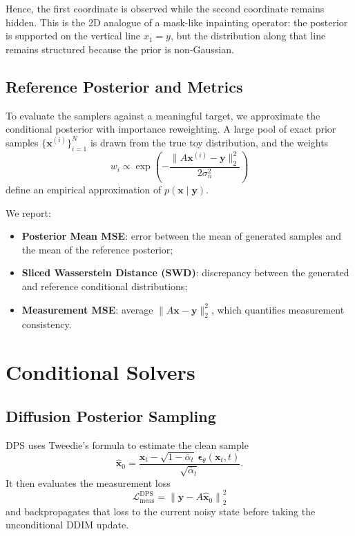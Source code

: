 \documentclass[10pt,twocolumn]{article}
\begin{document}
Hence, the first coordinate is observed while the second coordinate remains hidden. This is the 2D analogue of a mask-like inpainting operator: the posterior is supported on the vertical line \(x_1 = y\), but the distribution along that line remains structured because the prior is non-Gaussian.

\subsection{Reference Posterior and Metrics}

To evaluate the samplers against a meaningful target, we approximate the conditional posterior with importance reweighting. A large pool of exact prior samples \(\{\mathbf{x}^{(i)}\}_{i=1}^N\) is drawn from the true toy distribution, and the weights
\begin{equation}
w_i \propto \exp\left(
-\frac{\|A\mathbf{x}^{(i)} - \mathbf{y}\|_2^2}{2\sigma_n^2}
\right)
\end{equation}
define an empirical approximation of \(p(\mathbf{x}\mid \mathbf{y})\).

We report:
\begin{itemize}[leftmargin=1.5em]
    \item \textbf{Posterior Mean MSE}: error between the mean of generated samples and the mean of the reference posterior;
    \item \textbf{Sliced Wasserstein Distance (SWD)}: discrepancy between the generated and reference conditional distributions;
    \item \textbf{Measurement MSE}: average \(\|A\mathbf{x} - \mathbf{y}\|_2^2\), which quantifies measurement consistency.
\end{itemize}

\section{Conditional Solvers}

\subsection{Diffusion Posterior Sampling}

DPS uses Tweedie's formula to estimate the clean sample
\begin{equation}
\hat{\mathbf{x}}_0
=
\frac{
\mathbf{x}_t - \sqrt{1-\bar{\alpha}_t}\,\boldsymbol{\epsilon}_\theta(\mathbf{x}_t,t)
}{
\sqrt{\bar{\alpha}_t}
}.
\end{equation}
It then evaluates the measurement loss
\begin{equation}
\mathcal{L}_{\mathrm{meas}}^{\mathrm{DPS}}
=
\left\|
\mathbf{y} - A\hat{\mathbf{x}}_0
\right\|_2^2
\end{equation}
and backpropagates that loss to the current noisy state before taking the unconditional DDIM update.
\end{document}
